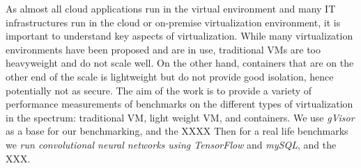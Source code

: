 \begin{abstract}
\end{abstract}
%
As almost all cloud applications run in the virtual environment and many IT infrastructures run in the cloud or on-premise virtualization environment, it is important to understand key aspects of virtualization.
%
While many virtualization environments have been proposed and are in use, traditional VMs are too heavyweight and do not scale well.
%
On the other hand, containers that are on the other end of the scale is lightweight but do not provide good isolation, hence potentially not as secure.
%
The aim of the work is to provide a variety of performance measurements of benchmarks on the different types of virtualization in the spectrum: traditional VM, light weight VM, and containers.
%
We use \emph{gVisor} as a base for our benchmarking, and the XXXX
%
Then for a real life benchmarks we \emph{run convolutional neural networks using TensorFlow} and \emph{mySQL}, and the XXX.
%